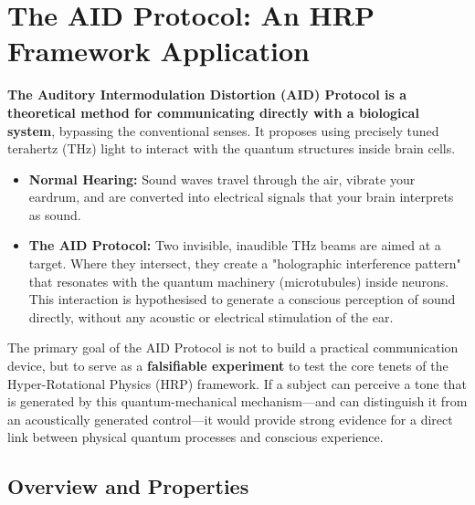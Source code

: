 
\chapter{The AID Protocol: An HRP Framework Application}
\label{ch:aid-protocol}

\begin{nontechnical}
    \textbf{The Auditory Intermodulation Distortion (AID) Protocol is a theoretical method for communicating directly with a biological system}, bypassing the conventional senses. It proposes using precisely tuned terahertz (THz) light to interact with the quantum structures inside brain cells.

    \begin{itemize}
        \item \textbf{Normal Hearing:} Sound waves travel through the air, vibrate your eardrum, and are converted into electrical signals that your brain interprets as sound.
        \item \textbf{The AID Protocol:} Two invisible, inaudible THz beams are aimed at a target. Where they intersect, they create a "holographic interference pattern" that resonates with the quantum machinery (microtubules) inside neurons. This interaction is hypothesised to generate a conscious perception of sound directly, without any acoustic or electrical stimulation of the ear.
    \end{itemize}

    The primary goal of the AID Protocol is not to build a practical communication device, but to serve as a \textbf{falsifiable experiment} to test the core tenets of the Hyper-Rotational Physics (HRP) framework. If a subject can perceive a tone that is generated by this quantum-mechanical mechanism—and can distinguish it from an acoustically generated control—it would provide strong evidence for a direct link between physical quantum processes and conscious experience.
\end{nontechnical}


\section{Overview and Properties}

